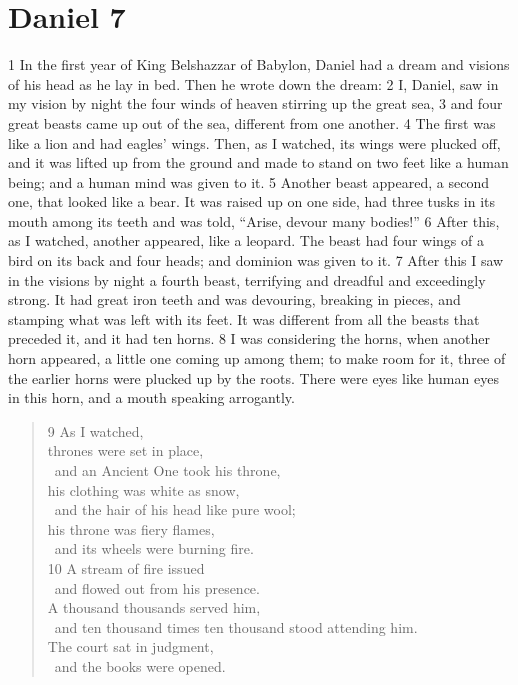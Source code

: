 \chapter{Daniel 7}
\label{ch:daniel7}

1 In the first year of King Belshazzar of Babylon, Daniel had a dream and visions
of his head as he lay in bed. Then he wrote down the dream: 2 I, Daniel, saw in
my vision by night the four winds of heaven stirring up the great sea, 3 and 
four great beasts came up out of the sea, different from one another. 4 The 
first was like a lion and had eagles' wings. Then, as I watched, its wings were
plucked off, and it was lifted up from the ground and made to stand on two feet 
like a human being; and a human mind was given to it. 5 Another beast appeared, 
a second one, that looked like a bear. It was raised up on one side, had three 
tusks in its mouth among its teeth and was told, ``Arise, devour many bodies!'' 
6 After this, as I watched, another appeared, like a leopard. The beast had 
four wings of a bird on its back and four heads; and dominion was given to it.
7 After this I saw in the visions by night a fourth beast, terrifying and 
dreadful and exceedingly strong. It had great iron teeth and was devouring, 
breaking in pieces, and stamping what was left with its feet. It was different
from all the beasts that preceded it, and it had ten horns. 8 I was considering
the horns, when another horn appeared, a little one coming up among them; to 
make room for it, three of the earlier horns were plucked up by the roots. 
There were eyes like human eyes in this horn, and a mouth speaking arrogantly.

\begin{verse}
9 As I watched,\\
thrones were set in place,\\
\vgap~and an Ancient One took his throne,\\
his clothing was white as snow,\\
\vgap~and the hair of his head like pure wool;\\
his throne was fiery flames,\\
\vgap~and its wheels were burning fire.\\
10 A stream of fire issued\\
\vgap~and flowed out from his presence.\\
A thousand thousands served him,\\
\vgap~and ten thousand times ten thousand stood attending him.\\
The court sat in judgment,\\
\vgap~and the books were opened.
\end{verse}

